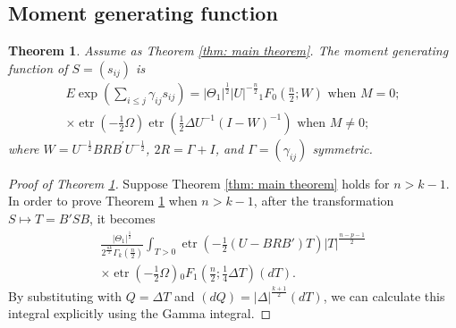 \documentclass{amsart}
\newtheorem{theorem}{Theorem}[section]
\theoremstyle{definition}
\numberwithin{equation}{section}
\begin{document}
\subsection{Moment generating function}

\begin{theorem} \label{thm: main theorem 2}  Assume as Theorem \ref{thm: main theorem}. The moment generating function of  $ S = (s_{ij})$ is 
        \begin{eqnarray}
        {E}\exp \left(\sum_{i\leq j}\gamma_{ij}s_{ij}\right) = | \varTheta_{1}|^{\frac{1}{2}} | U|^{-\frac{n}{2}}{_{1}}F_{0} \left(\frac{n}{2};  W\right) \text{ when } {M}=0; \label{eq: central mgf}\\
            \times \operatorname{etr} \left(-\frac{1}{2}  \varOmega\right) \operatorname{etr} \left(\frac{1}{2}  \varDelta   U^{-1}( I -  W)^{-1}\right) \text{ when } {M}\neq0;\label{eq: non-central mgf} 
        \end{eqnarray}
                    where $ W =   U^{-\frac{1}{2}}  B R B^{\prime} U^{-\frac{1}{2}} $, $2 R =  \varGamma +  I$, and $ \varGamma = (\gamma_{ij})$ symmetric. 
\end{theorem}
\begin{proof}[Proof of Theorem \ref{thm: main theorem 2}]
    Suppose Theorem \ref{thm: main theorem} holds for $n > k-1$. In order to prove Theorem \ref{thm: main theorem 2} when $n > k-1$, after the transformation $ S \mapsto  T =  B' S B$, it becomes
\[\begin{aligned}
    \frac{| \varTheta_{1}|^{\frac{1}{2}}}{2^{\frac{nk}{2}}\varGamma_{k}(\frac{n}{2})}   \int_{ T >  0} \operatorname{etr} \left(-\frac{1}{2} ( U -  B R  B') T\right) | T|^{\frac{n-p-1}{2}} \\
    \times   \operatorname{etr} \left(-\frac{1}{2}  \varOmega\right)    {}_{0}F_{1}\left(\frac{n}{2};\frac{1}{4} \varDelta  T\right)(d  T).
\end{aligned}\]
By substituting with $Q =  \varDelta  T$ and $(d Q) = | \varDelta|^{\frac{k+1}{2}}(d T)$, we can calculate this integral explicitly using the Gamma integral. 
\end{proof}

\end{document}
